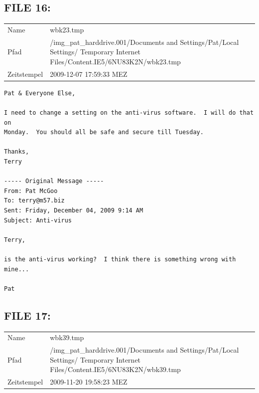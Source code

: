 \subsection{FILE 16:}
\label{sec:pat_emails_16}	

\begin{table}[htb]
	\begin{tabular}{p{2cm} p{13.5cm}}
		Name & wbk23.tmp\\
		Pfad & /img_pat_harddrive.001/Documents and Settings/Pat/Local Settings/ Temporary Internet Files/Content.IE5/6NU83K2N/wbk23.tmp\\
		Zeitstempel & 2009-12-07 17:59:33 MEZ
	\end{tabular}
\end{table}	

\begin{lstlisting}
Pat & Everyone Else,

I need to change a setting on the anti-virus software.  I will do that on 
Monday.  You should all be safe and secure till Tuesday.

Thanks,
Terry

----- Original Message -----
From: Pat McGoo
To: terry@m57.biz
Sent: Friday, December 04, 2009 9:14 AM
Subject: Anti-virus

Terry,

is the anti-virus working?  I think there is something wrong with
mine...

Pat

\end{lstlisting}

\subsection{FILE 17:}	
\label{sec:pat_emails_17}

\begin{table}[htb]
	\begin{tabular}{p{2cm} p{13.5cm}}
		Name & wbk39.tmp\\
		Pfad & /img_pat_harddrive.001/Documents and Settings/Pat/Local Settings/ Temporary Internet Files/Content.IE5/6NU83K2N/wbk39.tmp\\
		Zeitstempel & 2009-11-20 19:58:23 MEZ
	\end{tabular}
\end{table}	

